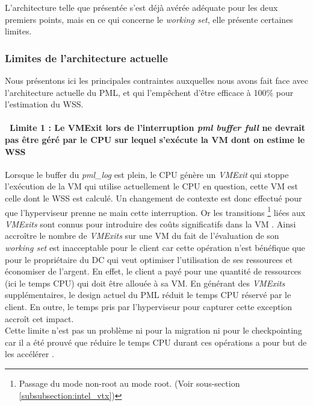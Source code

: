 \noindent L'architecture telle que présentée s'est déjà avérée adéquate pour les deux premiers points, mais en ce qui concerne le \textit{working set}, elle présente certaines limites.

\subsubsection{Limites de l'architecture actuelle}
\label{subsubsection:limites_pml_actuel}
Nous présentons ici les principales contraintes auxquelles nous avons fait face avec l'architecture actuelle du PML, et qui l'empêchent d'être efficace à 100\% pour l'estimation du WSS.

\paragraph{\textbullet\ \textbf{Limite 1 : Le VMExit lors de l'interruption \textit{pml buffer full} ne devrait pas être géré par le CPU sur lequel s'exécute la VM dont on estime le WSS}}
\par\noindent
\par\noindent Lorsque le buffer du \textit{pml\_log} est plein, le CPU génère un \textit{VMExit} qui stoppe l'exécution de la VM qui utilise actuellement le CPU en question, cette VM est celle dont le WSS est calculé. Un changement de contexte est donc effectué pour que l'hyperviseur prenne ne main cette interruption. Or les transitions \footnote{Passage du mode non-root au mode root. (Voir sous-section \ref{subsubsection:intel_vtx})} liées aux \textit{VMExits} sont connus pour introduire des coûts significatifs dans la VM \cite{overhead_VMExit}. Ainsi accroître le nombre de \textit{VMExits} sur une VM du fait de l'évaluation de son \textit{working set} est inacceptable pour le client car cette opération n'est bénéfique que pour le propriétaire du DC qui veut optimiser l'utilisation de ses ressources et économiser de l'argent. En effet, le client a payé pour une quantité de ressources (ici le temps CPU) qui doit être allouée à sa VM. En générant des \textit{VMExits} supplémentaires, le design actuel du PML réduit le temps CPU réservé par le client. En outre, le temps pris par l'hyperviseur pour capturer cette exception accroît cet impact.\\
Cette limite n'est pas un problème ni pour la migration ni pour le checkpointing car il a été prouvé que réduire le temps CPU durant ces opérations a pour but de les accélérer \cite{cpu_time_migration}.


